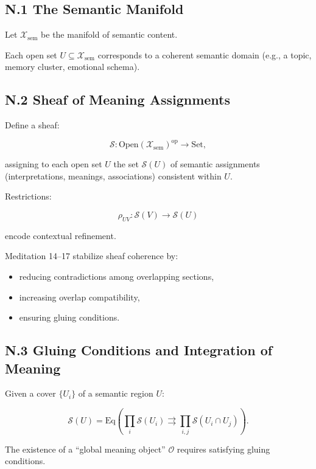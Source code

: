 \documentclass[12pt]{article}
\begin{document}
\subsection*{N.1 The Semantic Manifold}

Let $\mathcal{X}_{\text{sem}}$ be the manifold of semantic content.

Each open set $U \subseteq \mathcal{X}_{\text{sem}}$ corresponds to a coherent
semantic domain (e.g., a topic, memory cluster, emotional schema).

\subsection*{N.2 Sheaf of Meaning Assignments}

Define a sheaf:

\[
\mathcal{S} : \mathrm{Open}(\mathcal{X}_{\text{sem}})^{\mathrm{op}} \to \mathrm{Set},
\]

assigning to each open set $U$ the set $\mathcal{S}(U)$ of semantic assignments
(interpretations, meanings, associations) consistent within $U$.

Restrictions:

\[
\rho_{UV} : \mathcal{S}(V) \to \mathcal{S}(U)
\]

encode contextual refinement.

Meditation 14–17 stabilize sheaf coherence by:

\begin{itemize}
    \item reducing contradictions among overlapping sections,
    \item increasing overlap compatibility,
    \item ensuring gluing conditions.
\end{itemize}

\subsection*{N.3 Gluing Conditions and Integration of Meaning}

Given a cover $\{U_i\}$ of a semantic region $U$:

\[
\mathcal{S}(U) = \mathrm{Eq}\left(
\prod_i \mathcal{S}(U_i)
\rightrightarrows
\prod_{i,j} \mathcal{S}(U_i \cap U_j)
\right).
\]

The existence of a “global meaning object” $\mathcal{O}$ requires satisfying
gluing conditions.
\end{document}
